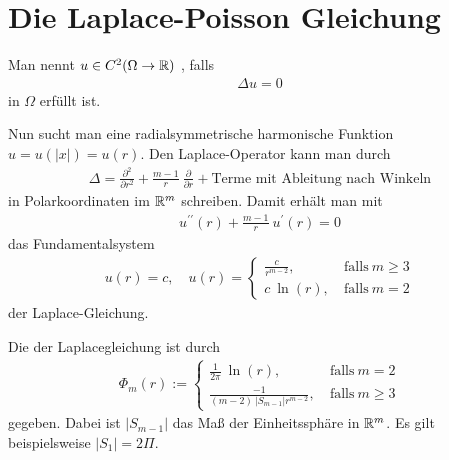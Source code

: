 \section{Die Laplace-Poisson Gleichung}

\begin{df}
Man nennt $u \in C^2( \Omega \to \mathbb{R})$
, falls
\begin{align*}
\Delta u = 0
\end{align*}
in $\Omega$ erfüllt ist.
\end{df}
Nun sucht man eine radialsymmetrische harmonische Funktion
$u = u(|x|) = u(r)$.
Den Laplace-Operator kann man durch
\begin{align*}
\Delta
= \frac{\partial^2}{\partial r^2} 
+ \frac{m-1}{r} \ \frac{\partial}{\partial r}
+ \text{Terme mit Ableitung nach Winkeln}
\end{align*}
in Polarkoordinaten im $\mathbb{R}^m$ schreiben.
Damit erhält man mit
\begin{align*}
u^{\prime \prime}(r) + \frac{m-1}{r} \ u^\prime(r) = 0
\end{align*}
das Fundamentalsystem
\begin{align*}
u(r) = c, \quad
u(r) =
\begin{cases}
\frac{c}{r^{m-2}}, &\ \text{falls} \ m\geq 3\\
c \ \ln(r) , &\ \text{falls} \ m = 2
\end{cases}
\end{align*}
der Laplace-Gleichung.

\begin{df}
Die  der Laplacegleichung ist durch
\begin{align*}
\Phi_m(r)
:= 
\begin{cases}
\frac{1}{2 \pi} \ \ln(r), &\ \text{falls} \ m=2 \\
\frac{-1}{(m-2) \ |S_{m-1}| r^{m-2}}, &\ \text{falls} \ m \geq 3
\end{cases}
\end{align*}
gegeben.
Dabei ist $|S_{m-1}|$ das Maß der Einheitssphäre in $\mathbb{R}^m$.
Es gilt beispielsweise $|S_1| = 2 \Pi$.
\end{df}